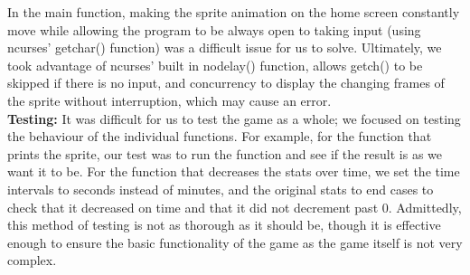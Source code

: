 \documentclass[11pt]{article}
\begin{document}
In the main function, making the sprite animation on the home screen constantly move while allowing the program to be always open to taking input (using ncurses’ getchar() function) was a difficult issue for us to solve. Ultimately, we took advantage of ncurses’ built in nodelay() function, allows getch() to be skipped if there is no input, and concurrency to display the changing frames of the sprite without interruption, which may cause an error.\\
\textbf{Testing: }
It was difficult for us to test the game as a whole; we focused on testing the behaviour of the individual functions. For example, for the function that prints the sprite, our test was to run the function and see if the result is as we want it to be. For the function that decreases the stats over time, we set the time intervals to seconds instead of minutes, and the original stats to end cases to check that it decreased on time and that it did not decrement past 0.
Admittedly, this method of testing is not as thorough as it should be, though it is effective enough to ensure the basic functionality of the game as the game itself is not very complex.
\end{document}
